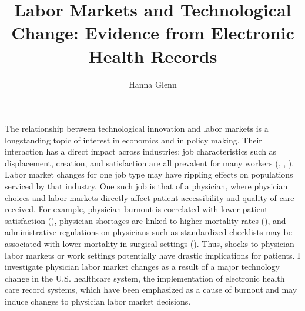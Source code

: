 \documentclass[11pt]{article}
\title{Labor Markets and Technological Change: Evidence from Electronic Health Records}
\author{Hanna Glenn}
\begin{document}
\maketitle



\vspace{1.5cm}

The relationship between technological innovation and labor markets is a longstanding topic of interest in economics and in policy making. Their interaction has a direct impact across industries; job characteristics such as displacement, creation, and satisfaction are all prevalent for many workers (\cite{autor2003skill}, \cite{fallick1996review}, \cite{akerlof1988job}). Labor market changes for one job type may have rippling effects on populations serviced by that industry. One such job is that of a physician, where physician choices and labor markets directly affect patient accessibility and quality of care received. For example, physician burnout is correlated with lower patient satisfaction (\cite{shanafelt2002burnout}), physician shortages are linked to higher mortality rates (\cite{gong2019higher}), and administrative regulations on physicians such as standardized checklists may be associated with lower mortality in surgical settings (\cite{treadwell2014surgical}). Thus, shocks to physician labor markets or work settings potentially have drastic implications for patients. I investigate physician labor market changes as a result of a major technology change in the U.S. healthcare system, the implementation of electronic health care record systems, which have been emphasized as a cause of burnout and may induce changes to physician labor market decisions.
\end{document}
